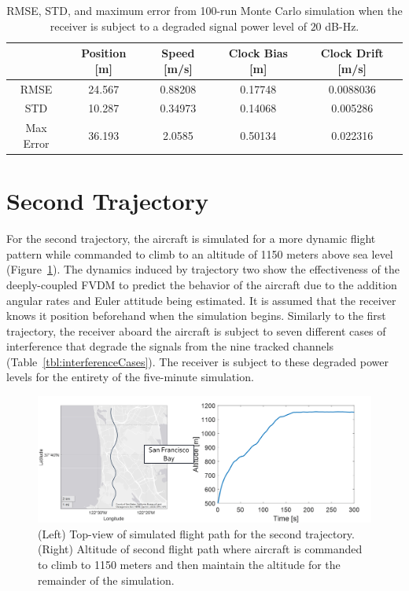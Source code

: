 \begin{table}[!ht]
    \caption{RMSE, STD, and maximum error from 100-run Monte Carlo simulation when the receiver is subject to a degraded signal power level of \(20\) dB-Hz.}\label{tbl:straight20CV}
    \centering
    \begin{tabular}{ccccc}
        \toprule
                  & Position [m] & Speed [m/s] & Clock Bias [m] & Clock Drift [m/s] \\
        \midrule
        RMSE      & 24.567       & 0.88208     & 0.17748        & 0.0088036         \\
        STD       & 10.287       & 0.34973     & 0.14068        & 0.005286          \\
        Max Error & 36.193       & 2.0585      & 0.50134        & 0.022316          \\
        \bottomrule
    \end{tabular}
\end{table}

\clearpage

\section{\textbf{Second Trajectory}}
For the second trajectory, the aircraft is simulated for a more dynamic flight pattern while commanded to climb to an altitude of 1150 meters above sea level (Figure~\ref{fig:trajectory2}). The dynamics induced by trajectory two show the effectiveness of the deeply-coupled FVDM to predict the behavior of the aircraft due to the addition angular rates and Euler attitude being estimated. It is assumed that the receiver knows it position beforehand when the simulation begins. Similarly to the first trajectory, the receiver aboard the aircraft is subject to seven different cases of interference that degrade the signals from the nine tracked channels (Table~\ref{tbl:interferenceCases}). The receiver is subject to these degraded power levels for the entirety of the five-minute simulation.

\begin{figure}[!ht]
    \centering
    \includegraphics[width=\linewidth]{Figures/Results/trajectory2.png}
    \caption{(Left) Top-view of simulated flight path for the second trajectory. (Right) Altitude of second flight path where aircraft is commanded to climb to 1150 meters and then maintain the altitude for the remainder of the simulation.}\label{fig:trajectory2}
\end{figure}

